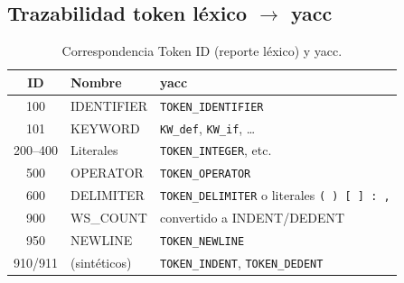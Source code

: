 \subsection{Trazabilidad token léxico $\rightarrow$ yacc}
\begin{table}[H]
\centering
\caption{Correspondencia Token ID (reporte léxico) y yacc.}
\begin{tabular}{@{}cll@{}}
\toprule
ID & Nombre & yacc \\
\midrule
100 & IDENTIFIER & \texttt{TOKEN\_IDENTIFIER} \\
101 & KEYWORD & \texttt{KW\_def}, \texttt{KW\_if}, \ldots \\
200--400 & Literales & \texttt{TOKEN\_INTEGER}, etc. \\
500 & OPERATOR & \texttt{TOKEN\_OPERATOR} \\
600 & DELIMITER & \texttt{TOKEN\_DELIMITER} o literales \texttt{( ) [ ] : ,} \\
900 & WS\_COUNT & convertido a INDENT/DEDENT \\
950 & NEWLINE & \texttt{TOKEN\_NEWLINE} \\
910/911 & (sintéticos) & \texttt{TOKEN\_INDENT}, \texttt{TOKEN\_DEDENT} \\
\bottomrule
\end{tabular}
\end{table}
